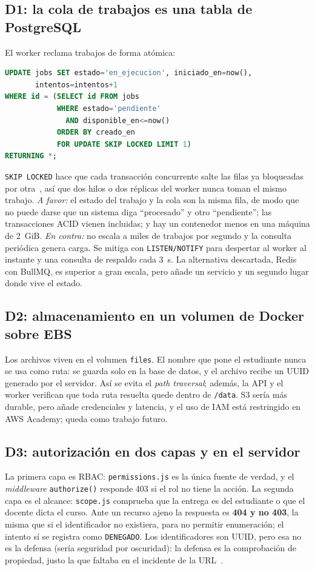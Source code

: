\documentclass[conference,a4paper]{IEEEtran}
\newcommand{\cod}[1]{\texttt{#1}}
\begin{document}
\subsection{D1: la cola de trabajos es una tabla de PostgreSQL}
El worker reclama trabajos de forma atómica:
\begin{lstlisting}[language=SQL]
UPDATE jobs SET estado='en_ejecucion', iniciado_en=now(),
       intentos=intentos+1
WHERE id = (SELECT id FROM jobs
            WHERE estado='pendiente'
              AND disponible_en<=now()
            ORDER BY creado_en
            FOR UPDATE SKIP LOCKED LIMIT 1)
RETURNING *;
\end{lstlisting}
\cod{SKIP LOCKED} hace que cada transacción concurrente salte las filas ya bloqueadas por otra~\cite{pg-select}, así que dos hilos o dos réplicas del worker nunca toman el mismo trabajo. \emph{A favor:} el estado del trabajo y la cola son la misma fila, de modo que no puede darse que un sistema diga ``procesado'' y otro ``pendiente''; las transacciones ACID vienen incluidas; y hay un contenedor menos en una máquina de 2~GiB. \emph{En contra:} no escala a miles de trabajos por segundo y la consulta periódica genera carga. Se mitiga con \cod{LISTEN/NOTIFY} para despertar al worker al instante y una consulta de respaldo cada 3~s. La alternativa descartada, Redis con BullMQ, es superior a gran escala, pero añade un servicio y un segundo lugar donde vive el estado.

\subsection{D2: almacenamiento en un volumen de Docker sobre EBS}
Los archivos viven en el volumen \cod{files}. El nombre que pone el estudiante nunca se usa como ruta: se guarda solo en la base de datos, y el archivo recibe un UUID generado por el servidor. Así se evita el \textit{path traversal}; además, la API y el worker verifican que toda ruta resuelta quede dentro de \cod{/data}. S3 sería más durable, pero añade credenciales y latencia, y el uso de IAM está restringido en AWS Academy; queda como trabajo futuro.

\subsection{D3: autorización en dos capas y en el servidor}
La primera capa es RBAC: \cod{permissions.js} es la única fuente de verdad, y el \textit{middleware} \cod{authorize()} responde 403 si el rol no tiene la acción. La segunda capa es el alcance: \cod{scope.js} comprueba que la entrega es del estudiante o que el docente dicta el curso. Ante un recurso ajeno la respuesta es \textbf{404 y no 403}, la misma que si el identificador no existiera, para no permitir enumeración; el intento sí se registra como \cod{DENEGADO}. Los identificadores son UUID, pero esa no es la defensa (sería seguridad por oscuridad): la defensa es la comprobación de propiedad, justo la que faltaba en el incidente de la URL~\cite{owasp-a01}.
\end{document}
